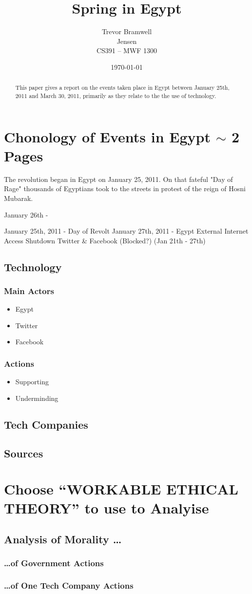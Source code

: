 \documentclass[12pt,letterpaper]{report}
\title{Spring in Egypt}
\author{
    Trevor Bramwell\\
    Jensen\\
    CS391 -- MWF 1300\\
}
\date{\today}
\begin{document}
\maketitle
\begin{abstract}
This paper gives a report on the events taken place in Egypt between January
25th, 2011 and March 30, 2011, primarily as they relate to the the use of
technology. 
\end{abstract}

\section{Chonology of Events in Egypt $\sim$ 2 Pages}
The revolution began in Egypt on January 25, 2011. On that fateful "Day of
Rage" thousands of Egyptians took to the streets in protest of the reign of
Hosni Mubarak.

January 26th - 

January 25th, 2011 - Day of Revolt
January 27th, 2011 - Egypt External Internet Access Shutdown
Twitter \& Facebook (Blocked?) (Jan 21th - 27th)

\subsection{Technology}
    \subsubsection{Main Actors}
    \begin{itemize}
        \item Egypt
        \item Twitter
        \item Facebook
    \end{itemize}

    \subsubsection{Actions}
    \begin{itemize}
        \item Supporting
        \item Underminding
    \end{itemize}
\subsection{Tech Companies}
\subsection{Sources}

\section{Choose ``WORKABLE ETHICAL THEORY'' to use to Analyise}
    \subsection{Analysis of Morality \ldots}
        \subsubsection{\ldots of Government Actions}
        \subsubsection{\ldots of One Tech Company Actions}

\pagebreak

\end{document}
